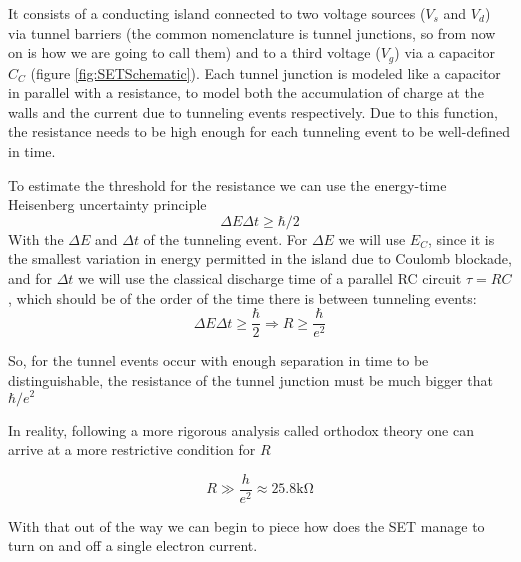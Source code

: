 \documentclass[../main.tex]{subfiles}
\begin{document}
It consists of a conducting island connected to two voltage sources (\(V_{s}\)
and \(V_{d}\)) via tunnel barriers (the common nomenclature is tunnel junctions,
so from now on is how we are going to call them) and to a third voltage
(\(V_{g}\)) via a capacitor \(C_{C}\) (figure \ref{fig:SETSchematic}). Each
tunnel junction is modeled like a capacitor in parallel with a resistance, to
model both the accumulation of charge at the walls and the current due to
tunneling events respectively. Due to this function, the resistance needs to be
high enough for each tunneling event to be well-defined in time.

To estimate the threshold for the resistance we can use the energy-time
Heisenberg uncertainty principle
\[\Delta E \Delta t \geq \hbar/2\]
With the \(\Delta E\) and \(\Delta t\) of the tunneling event. For \(\Delta E\)
we will use \(E_{C}\), since it is the smallest variation in energy permitted in
the island due to Coulomb blockade, and for \(\Delta t\) we will use the classical
discharge time of a parallel RC circuit \(\tau = RC\), which should be of the
order of the time there is between tunneling events:
\begin{equation*}
    \Delta E \Delta t \geq \frac{\hbar}{2} \Rightarrow R \geq \frac{\hbar}{e^2}
\end{equation*}

So, for the tunnel events occur with enough separation in time to be
distinguishable, the resistance of the tunnel junction must be much bigger
that \(\hbar/e^2\)

In reality, following a more rigorous analysis called orthodox theory one can
arrive at a more restrictive condition for \(R\)\cite{hansonFundamentalsNanoelectronics2008}

\begin{equation*}
\label{eq:RTunnelCond}
    R \gg \frac{h}{e^2} \approx 25.8\unit{\kilo\ohm}
\end{equation*}

With that out of the way we can begin to piece how does the SET manage to turn
on and off a single electron current.
\end{document}
